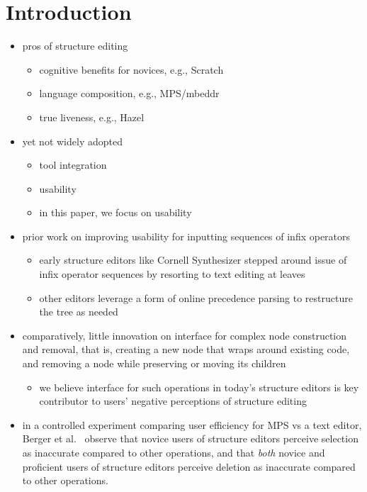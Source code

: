 \documentclass[runningheads]{llncs}
\newcommand{\Hazel}{\textsf{Hazel}\xspace}
\begin{document}
\section{Introduction}
\begin{itemize}
	\item pros of structure editing
		\begin{itemize}
			\item cognitive benefits for novices, e.g., Scratch
			\item language composition, e.g., MPS/mbeddr
			\item true liveness, e.g., \Hazel
		\end{itemize}
	\item yet not widely adopted
		\begin{itemize}
			\item tool integration
			\item usability
			\item in this paper, we focus on usability
		\end{itemize}
	\item prior work on improving usability for inputting sequences of infix operators
  	\begin{itemize}
  		\item early structure editors like Cornell Synthesizer stepped around issue of infix operator sequences by resorting to text editing at leaves
  		\item other editors leverage a form of online precedence parsing to restructure the tree as needed
  	\end{itemize}
	\item comparatively, little innovation on interface for complex node construction and removal, that is, creating a new node that wraps around existing code, and removing a node while preserving or moving its children
		\begin{itemize}
			\item we believe interface for such operations in today's structure editors is key contributor to users' negative perceptions of structure editing
		\end{itemize}
	\item in a controlled experiment comparing user efficiency for MPS vs a text editor, Berger et al.~ observe that novice users of structure editors perceive selection as inaccurate compared to other operations, and that \emph{both} novice and proficient users of structure editors perceive deletion as inaccurate compared to other operations.

\end{itemize}
\end{document}
